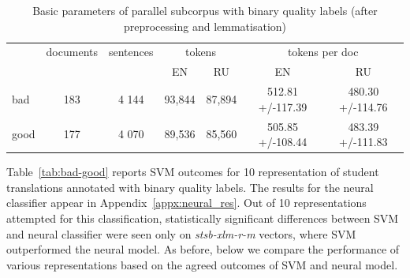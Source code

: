 \begin{table}[]
	\centering
	\begin{tabular}{l|c|c|cc|cc}
		\toprule
		       & documents & sentences & \multicolumn{2}{c|}{tokens} & \multicolumn{2}{c}{tokens per doc} \\
		       &           &           & EN      &  RU              & EN      &  RU \\
		\midrule  
		bad     & 183  	   & 4 144    & 93,844 & 87,894           & 512.81 +/-117.39 & 480.30 +/-114.76 \\  
		good    & 177      & 4 070    & 89,536 & 85,560           & 505.85 +/-108.44 & 483.39 +/-111.83 \\ 
		\bottomrule
	\end{tabular}
	\caption{\label{tab:binqua_pars} Basic parameters of parallel subcorpus with binary quality labels (after preprocessing and lemmatisation)}
\end{table}

Table~\ref{tab:bad-good} reports SVM outcomes for 10 representation of student translations annotated with binary quality labels. The results for the neural classifier appear in Appendix~\ref{appx:neural_res}. 
Out of 10 representations attempted for this classification, statistically significant differences between SVM and neural classifier were seen only on \textit{stsb-xlm-r-m} vectors, where SVM outperformed the neural model. As before, below we compare the performance of various representations based on the agreed outcomes of SVM and neural model. 

